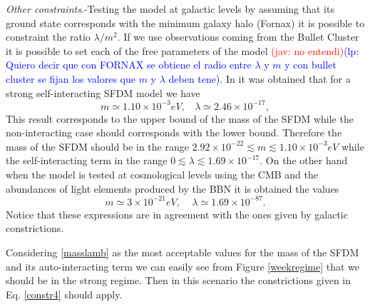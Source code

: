 \documentclass[amssymb,twocolumn,prd,nofootinbib,showpacs]{revtex4-1}
\newcommand{\jav}[1]{\textcolor{red}{(jav: #1)}}
\newcommand{\lp}[1]{\textcolor{blue}{(lp: #1)}}
\begin{document}
\textit{Other constraints}.-Testing the model at galactic levels by assuming that its ground state 
corresponds with the minimum galaxy halo (Fornax) \cite{SFphi42} it is possible to constraint the ratio $\lambda/m^2$. 
If we use observations coming from the Bullet Cluster \cite{bullet} it is possible to set each of the free parameters of the model \jav{no entendi}\lp{Quiero decir que con FORNAX se obtiene el radio entre $\lambda$ y $m$ y con bullet cluster se fijan los valores que $m$ y $\lambda$ deben tene}. 
In \cite{SFphi42} it was obtained that for a strong self-interacting SFDM model we have
%
\begin{equation}
m\simeq 1.10\times10^{-3}eV, \ \ \ \ \lambda \simeq 2.46\times 10^{-17},
\end{equation}
%
This result corresponds to the upper bound of the mass of the SFDM while the non-interacting case should corresponds with the lower bound. Therefore the mass of the SFDM should be in the range $2.92\times 10^{-22}\lesssim m\lesssim 1.10\times 10^{-3}eV$ while the self-interacting term in the range $0\lesssim \lambda \lesssim 1.69\times 10^{-17}$. On the other hand when the model is tested at cosmological levels using the CMB and the 
abundances of light elements produced by the BBN it is obtained the values \cite{SFphi41,SFphi42}
%
\begin{equation}\label{masslamb}
m\simeq3\times 10^{-21}eV, \ \ \ \ \ \lambda \simeq 1.69\times 10^{-87}.
\end{equation}
%
Notice that these expressions are in agreement with the ones given by galactic constrictions.

Considering \eqref{masslamb} as the most acceptable values for the mass of the SFDM and 
its auto-interacting term we can easily see from Figure \ref{weekregime} that we should be in the strong regime. 
Then in this scenario the constrictions given in Eq. \eqref{constr4} should apply. 
\end{document}
